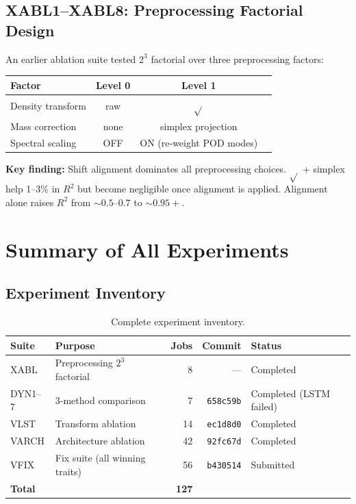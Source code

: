 \documentclass[11pt]{article}
\newcommand{\Rtwo}{R^2}
\begin{document}
\subsection{XABL1--XABL8: Preprocessing Factorial Design}

An earlier ablation suite tested $2^3$ factorial over three preprocessing
factors:
\begin{center}
\begin{tabular}{lccc}
\toprule
Factor & Level 0 & Level 1 \\
\midrule
Density transform & raw & $\sqrt{}$ \\
Mass correction & none & simplex projection \\
Spectral scaling & OFF & ON (re-weight POD modes) \\
\bottomrule
\end{tabular}
\end{center}

\textbf{Key finding:} Shift alignment dominates all preprocessing
choices.  $\sqrt{}$ + simplex help 1--3\% in $\Rtwo$ but become
negligible once alignment is applied.  Alignment alone raises $\Rtwo$
from $\sim 0.5\text{--}0.7$ to $\sim 0.95+$.


\section{Summary of All Experiments}
\label{sec:summary}

\subsection{Experiment Inventory}

\begin{table}[H]
\centering
\caption{Complete experiment inventory.}
\small
\begin{tabular}{@{}llrrl@{}}
\toprule
Suite & Purpose & Jobs & Commit & Status \\
\midrule
XABL & Preprocessing $2^3$ factorial & 8 & --- & Completed \\
DYN1--7 & 3-method comparison & 7 & \texttt{658c59b} & Completed (LSTM failed) \\
VLST & Transform ablation & 14 & \texttt{ec1d8d0} & Completed \\
VARCH & Architecture ablation & 42 & \texttt{92fc67d} & Completed \\
VFIX & Fix suite (all winning traits) & 56 & \texttt{b430514} & Submitted \\
\midrule
\textbf{Total} & & \textbf{127} & & \\
\bottomrule
\end{tabular}
\end{table}
\end{document}
